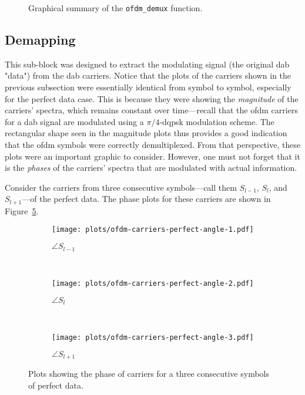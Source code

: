 \documentclass[class=report,11pt,crop=false]{standalone}
\begin{document}
\begin{figure}[htbp]
  \centering
  \captionsetup{type=figure}
  \def\svgwidth{\linewidth}
  { %
      }
  \caption{Graphical summary of the \texttt{ofdm\_demux} function.}
  \label{fig:ofdm_demux}
\end{figure}

\subsection{ Demapping \label{subsect:dab-proc_dqpsk-demap}}
This sub-block was designed to extract the modulating signal (the original \gls{dab} "data") from the \gls{dab} carriers. Notice that the plots of the carriers shown in the previous subsection were essentially identical from symbol to symbol, especially for the perfect data case. This is because they were showing the \emph{magnitude} of the carriers' spectra, which remains constant over time---recall that the \gls{ofdm} carriers for a \gls{dab} signal are modulated using a \(\pi/4\)-\gls{dqpsk} modulation scheme. The rectangular shape seen in the magnitude plots thus provides a good indication that the \gls{ofdm} symbols were correctly demultiplexed. From that perspective, these plots were an important graphic to consider. However, one must not forget that it is the \emph{phases} of the carriers' spectra that are modulated with actual information.

Consider the carriers from three consecutive symbols---call them \(S_{l-1}\), \(S_{l}\), and \(S_{l+1}\)---of the perfect data. The phase plots for these carriers are shown in Figure~\ref{fig:ofdm-carriers-perfect-angle}.

\begin{figure}[htbp]
  \centering
  \captionsetup{type=figure}
  \begin{subfigure}[t]{0.3\textwidth}
    \centering
    \captionsetup{type=figure}
    \texttt{[image: plots/ofdm-carriers-perfect-angle-1.pdf]}
    \caption{\(\angle S_{l-1}\)}
    \label{fig:ofdm-carriers-perfect-angle-1}
  \end{subfigure}%
  ~ 
  \begin{subfigure}[t]{0.3\textwidth}
    \centering
    \captionsetup{type=figure}
    \texttt{[image: plots/ofdm-carriers-perfect-angle-2.pdf]}
    \caption{\(\angle S_{l}\)}
    \label{fig:ofdm-carriers-perfect-angle-2}
  \end{subfigure}
  ~ 
  \begin{subfigure}[t]{0.3\textwidth}
    \centering
    \captionsetup{type=figure}
    \texttt{[image: plots/ofdm-carriers-perfect-angle-3.pdf]}
    \caption{\(\angle S_{l+1}\)}
    \label{fig:ofdm-carriers-perfect-angle-3}
  \end{subfigure}
  \caption{Plots showing the phase of  carriers for a three consecutive  symbols of perfect data.}
  \label{fig:ofdm-carriers-perfect-angle}
\end{figure}
\end{document}
